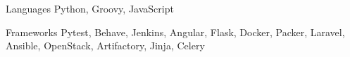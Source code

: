 
\begin{cvskills}
  \cvskill
    {Languages} %
    {Python, Groovy, JavaScript} %

  \cvskill
    {Frameworks} %
    {
        Pytest,
        Behave,
        Jenkins,
        Angular,
        Flask,
        Docker,
        Packer,
        Laravel,
        Ansible,
        OpenStack,
        Artifactory,
        Jinja,
        Celery
    } %

\end{cvskills}
